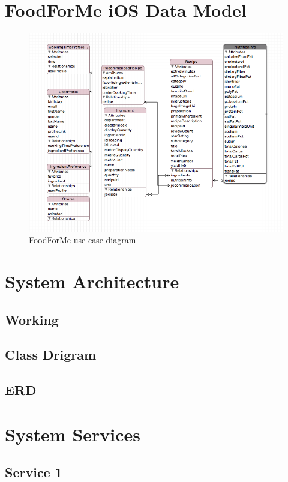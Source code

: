 \section*{FoodForMe iOS Data Model}	  
	   \begin{figure}[h]
	   	\centering
	   	\includegraphics[width=1\linewidth]{figures/ch4_ios_data_model}
	   	\caption{FoodForMe use case diagram}
	   	\label{fig:foodforme_recipe_screen}
	   \end{figure}
	   
	  
	  
\section{System Architecture}

\subsection{Working}

\subsection{Class Drigram}

\subsection{ERD}

\section{System Services}

\subsection{Service 1}
